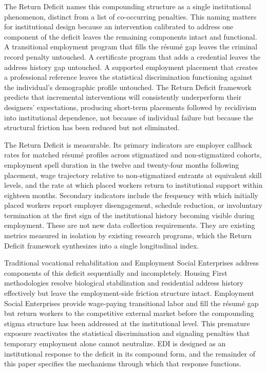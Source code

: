 \documentclass[12pt, letterpaper]{article}
\begin{document}
The Return Deficit names this compounding structure as a single institutional phenomenon, distinct from a list of co-occurring penalties. This naming matters for institutional design because an intervention calibrated to address one component of the deficit leaves the remaining components intact and functional. A transitional employment program that fills the r\'{e}sum\'{e} gap leaves the criminal record penalty untouched. A certificate program that adds a credential leaves the address history gap untouched. A supported employment placement that creates a professional reference leaves the statistical discrimination functioning against the individual's demographic profile untouched. The Return Deficit framework predicts that incremental interventions will consistently underperform their designers' expectations, producing short-term placements followed by recidivism into institutional dependence, not because of individual failure but because the structural friction has been reduced but not eliminated.

The Return Deficit is measurable. Its primary indicators are employer callback rates for matched r\'{e}sum\'{e} profiles across stigmatized and non-stigmatized cohorts, employment spell duration in the twelve and twenty-four months following placement, wage trajectory relative to non-stigmatized entrants at equivalent skill levels, and the rate at which placed workers return to institutional support within eighteen months. Secondary indicators include the frequency with which initially placed workers report employer disengagement, schedule reduction, or involuntary termination at the first sign of the institutional history becoming visible during employment. These are not new data collection requirements. They are existing metrics measured in isolation by existing research programs, which the Return Deficit framework synthesizes into a single longitudinal index.

Traditional vocational rehabilitation and Employment Social Enterprises address components of this deficit sequentially and incompletely. Housing First methodologies \citep{tsemberis2004housing} resolve biological stabilization and residential address history effectively but leave the employment-side friction structure intact. Employment Social Enterprises provide wage-paying transitional labor and fill the r\'{e}sum\'{e} gap but return workers to the competitive external market before the compounding stigma structure has been addressed at the institutional level. This premature exposure reactivates the statistical discrimination and signaling penalties that temporary employment alone cannot neutralize. EDI is designed as an institutional response to the deficit in its compound form, and the remainder of this paper specifies the mechanisms through which that response functions.
\end{document}
